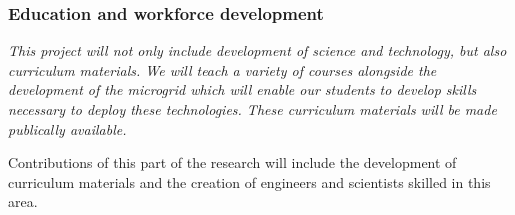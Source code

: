 
\subsubsection{Education and workforce development}

{\em This project will not only include development of science and
  technology, but also curriculum materials. We will teach a variety of
  courses alongside the development of the microgrid which will enable our
  students to develop skills necessary to deploy these technologies. These
  curriculum materials will be made publically available.

  Contributions of this part of the research will include the development of curriculum
  materials and the creation of engineers and scientists skilled in this
  area.}
